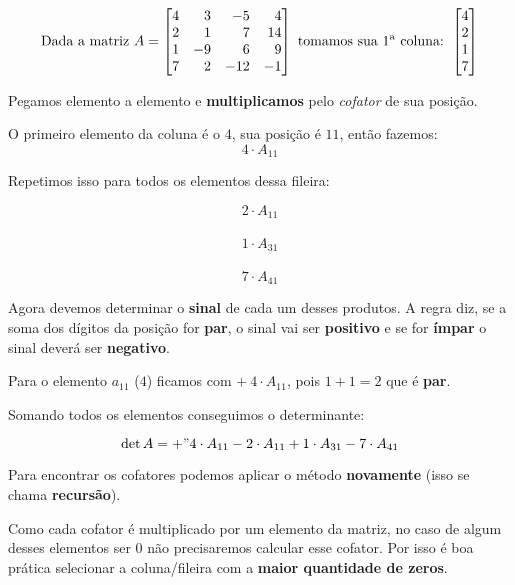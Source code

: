 $$
\text{Dada a matriz }A=\begin{bmatrix*}[r]
    4 & 3 & -5 & 4\\ 2 & 1 & 7 & 14 \\ 1 & -9 & 6 & 9 \\ 7 & 2 & -12 & -1
\end{bmatrix*} \text{ tomamos sua 1\textsuperscript{a} coluna: }\begin{bmatrix*}[r]
    4 \\ 2 \\ 1 \\ 7
\end{bmatrix*}
$$

Pegamos elemento a elemento e \textbf{multiplicamos} pelo \textit{cofator} de sua posição.

O primeiro elemento da coluna é o $4$, sua posição é $11$, então fazemos:
$$4\cdot A_{11}$$

Repetimos isso para todos os elementos dessa fileira:
\vspace{-2em}
\begin{multicols}{3}
    $$2\cdot A_{11}$$ \\ $$1\cdot A_{31}$$ \\ $$7 \cdot A_{41}$$
\end{multicols}

Agora devemos determinar o \textbf{sinal} de cada um desses produtos. A regra diz, se a soma dos dígitos da posição for \textbf{par}, o sinal vai ser \textbf{positivo} e se for \textbf{ímpar} o sinal deverá ser \textbf{negativo}.

Para o elemento $a_{11}$ ($4$) ficamos com $+~4\cdot A_{11}$, pois $1+1=2$ que é \textbf{par}.

Somando todos os elementos conseguimos o determinante:

$$
\det A= +"4\cdot A_{11} - 2\cdot A_{11} + 1\cdot A_{31} - 7 \cdot A_{41}
$$

Para encontrar os cofatores podemos aplicar o método \textbf{novamente} (isso se chama \textbf{recursão}).

Como cada cofator é multiplicado por um elemento da matriz, no caso de algum desses elementos ser $0$ não precisaremos calcular esse cofator. Por isso é boa prática selecionar a coluna/fileira com a \textbf{maior quantidade de zeros}.